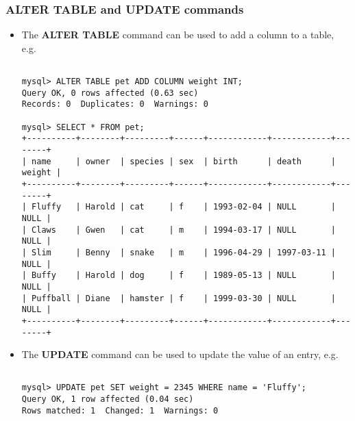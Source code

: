 \documentclass[hyperref={pdfpagelabels=false},svgnames,xcolor=table]{beamer}
\begin{document}
\begin{frame}[shrink=10,fragile]
  \frametitle{ALTER TABLE and UPDATE commands}
  \begin{itemize}
    \item The \textbf{ALTER TABLE} command can be used to add a
      column to a table, e.g.\
\begin{scriptsize}
\begin{verbatim}

mysql> ALTER TABLE pet ADD COLUMN weight INT;
Query OK, 0 rows affected (0.63 sec)
Records: 0  Duplicates: 0  Warnings: 0

mysql> SELECT * FROM pet;
+----------+--------+---------+------+------------+------------+--------+
| name     | owner  | species | sex  | birth      | death      | weight |
+----------+--------+---------+------+------------+------------+--------+
| Fluffy   | Harold | cat     | f    | 1993-02-04 | NULL       |   NULL |
| Claws    | Gwen   | cat     | m    | 1994-03-17 | NULL       |   NULL |
| Slim     | Benny  | snake   | m    | 1996-04-29 | 1997-03-11 |   NULL |
| Buffy    | Harold | dog     | f    | 1989-05-13 | NULL       |   NULL |
| Puffball | Diane  | hamster | f    | 1999-03-30 | NULL       |   NULL |
+----------+--------+---------+------+------------+------------+--------+

\end{verbatim}
\end{scriptsize}
    \item The \textbf{UPDATE} command can be used to update the value of
      an entry, e.g.\
\begin{scriptsize}
\begin{verbatim}

mysql> UPDATE pet SET weight = 2345 WHERE name = 'Fluffy';
Query OK, 1 row affected (0.04 sec)
Rows matched: 1  Changed: 1  Warnings: 0
\end{verbatim}
\end{scriptsize}
  \end{itemize}
\end{frame}
\end{document}
